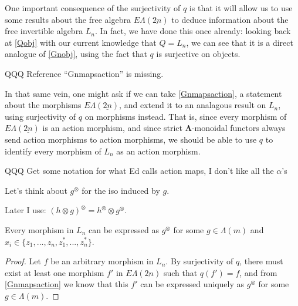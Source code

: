\documentclass{amsbook} %
\newcommand{\ML}{\mathbf{\Lambda}}
\newcommand{\ELnn}{E\Lambda(\underline{2n})}
\numberwithin{section}{chapter}
\begin{document}
One important consequence of the surjectivity of $q$ is that it will allow us to use some results about the free algebra $\ELnn$ to deduce information about the free invertible algebra $L_n$. In fact, we have done this once already: looking back at \cref{Qobj} with our current knowledge that $Q = L_n$, we can see that it is a direct analogue of \cref{Gnobj}, using the fact that $q$ is surjective on objects. 


QQQ Reference ``Gnmapsaction'' is missing.


In that same vein, one might ask if we can take \cref{Gnmapsaction}, a statement about the morphisms $\ELnn$, and extend it to an analagous result on $L_n$, using surjectivity of $q$ on morphisms instead. That is, since every morphism of $\ELnn$ is an action morphism, and since strict $\ML$-monoidal functors always send action morphisms to action morphisms, we should be able to use $q$ to identify every morphism of $L_n$ as an action morphism. 


QQQ Get some notation for what Ed calls action maps, I don't like all the $\alpha$'s

\begin{nota}\label{newaction}
Let's think about $g^{\otimes}$ for the iso induced by $g$.
\end{nota}

\begin{lem}\label{otimesotimes}
Later I use: $(h \otimes g)^{\otimes} = h^{\otimes} \otimes g^{\otimes}$.
\end{lem}

\begin{lem} \label{allmapsaction} Every morphism in $L_n$ can be expressed as $g^{\otimes}$
for some $g \in \Lambda(m)$ and $x_i \in \{z_1, ..., z_n, z_1^*, ..., z_n^* \}$.
\end{lem}
\begin{proof}
Let $f$ be an arbitrary morphism in $L_n$. By surjectivity of $q$, there must exist at least one morphism $f'$ in $\ELnn$ such that $q(f') = f$, and from \cref{Gnmapsaction} we know that this $f'$ can be expressed uniquely as $g^{\otimes}$ for some $g \in \Lambda(m)$. %
\end{proof}
\end{document}
